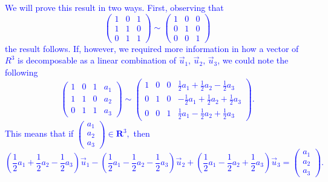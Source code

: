 \documentclass[a4paper,11pt]{article}
\newcommand{\R}{\mathbf{R}}
\newcommand{\BB}[1]{\textcolor{blue}{#1}}
\begin{document}
\BB{We will prove this result in two ways. First, observing that
  \[
    \left(
      \begin{array}{rrr}
        1 & 0 & 1 \\
        1 & 1 & 0 \\
        0 & 1 & 1
      \end{array}
    \right)
    \sim
    \left(
      \begin{array}{rrr}
        1 & 0 & 0 \\
        0 & 1 & 0 \\
        0 & 0 & 1
      \end{array}
    \right)
  \]
  the result follows. If, however, we required more information in how a vector
  of $R^3$ is decomposable as a linear combination of $\vec u_1,\,\vec u_2,\,\vec
  u_3$, we could note the following
  \[
    \left(
      \begin{array}{rrrr}
        1 & 0 & 1 & a_1 \\
        1 & 1 & 0 & a_2 \\
        0 & 1 & 1 & a_3
      \end{array}
    \right) 
    \sim
    \left(
      \begin{array}{rrrr}
        1 & 0 & 0 & \frac{1}{2}a_1+\frac{1}{2}a_2-\frac{1}{2}a_3 \\
        0 & 1 & 0 & -\frac{1}{2}a_1+\frac{1}{2}a_2+\frac{1}{2}a_3 \\
        0 & 0 & 1 & \frac{1}{2}a_1-\frac{1}{2}a_2+\frac{1}{2}a_3
      \end{array}
    \right).
  \]
  This means that if
  $
  \left(
    \begin{smallmatrix}
      a_1\\a_2\\a_3
    \end{smallmatrix}
  \right)
  \in \R^3,
  $
  then
  \[
    \left( \frac{1}{2}a_1+\frac{1}{2}a_2-\frac{1}{2}a_3 \right)\vec u_1-
    \left( \frac{1}{2}a_1-\frac{1}{2}a_2-\frac{1}{2}a_3 \right)\vec u_2+
    \left( \frac{1}{2}a_1-\frac{1}{2}a_2+\frac{1}{2}a_3 \right)\vec u_3=
    \begin{pmatrix}a_1\\a_2\\a_3\end{pmatrix}.
  \] \\
}
\end{document}
